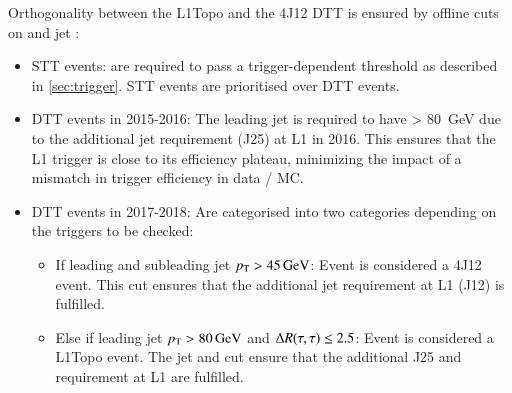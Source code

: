 Orthogonality between the L1Topo and the 4J12 DTT is ensured by offline cuts on
\tauhadvis and jet \pT:
\begin{itemize}
\item STT events: \tauhadvis are required to pass a trigger-dependent \pT
  threshold as described in \cref{sec:trigger}. STT events are prioritised over
  DTT events.

\item DTT events in 2015-2016: The leading jet is required to have \pT >
  \SI{80}{\GeV} due to the additional jet requirement (J25) at L1 in 2016. This
  ensures that the L1 trigger is close to its efficiency plateau, minimizing the
  impact of a mismatch in trigger efficiency in data / MC.

\item DTT events in 2017-2018: Are categorised into two categories depending on
  the triggers to be checked:
  \begin{itemize}
  \item If leading and subleading jet $p_{\text{T}} > \SI{45}{\ensuremath{\text{GeV}}}$: Event is considered a
    4J12 event. This cut ensures that the additional jet requirement at L1 (J12)
    is fulfilled.
  \item Else if leading jet $\pT > \SI{80}{\GeV}$ and $\Delta R(\tau, \tau) \leq 2.5$:
    Event is considered a L1Topo event. The jet \pT and \dRtautau cut ensure
    that the additional J25 and \dRtautau requirement at L1 are fulfilled.
  \end{itemize}
\end{itemize}


